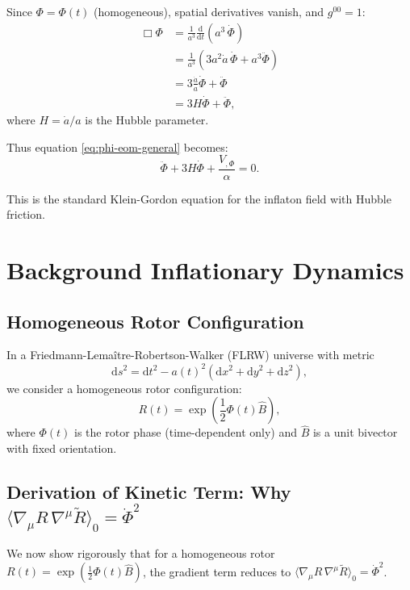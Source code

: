 \documentclass[11pt,a4paper]{article}
\numberwithin{equation}{section}
\theoremstyle{plain}
\theoremstyle{definition}
\theoremstyle{remark}
\newcommand{\dd}{\mathrm{d}}
\begin{document}
Since $\Phi = \Phi(t)$ (homogeneous), spatial derivatives vanish, and $g^{00} = 1$:
\begin{align}
\Box\Phi &= \frac{1}{a^3}\frac{\dd}{\dd t}\left(a^3\,\dot{\Phi}\right)\\
&= \frac{1}{a^3}\left(3a^2\dot{a}\,\dot{\Phi} + a^3\ddot{\Phi}\right)\\
&= 3\frac{\dot{a}}{a}\dot{\Phi} + \ddot{\Phi}\\
&= 3H\dot{\Phi} + \ddot{\Phi},
\end{align}
where $H = \dot{a}/a$ is the Hubble parameter.

Thus equation \eqref{eq:phi-eom-general} becomes:
\begin{equation}
\ddot{\Phi} + 3H\dot{\Phi} + \frac{V_{,\Phi}}{\alpha} = 0.
\label{eq:phi-klein-gordon}
\end{equation}

This is the standard Klein-Gordon equation for the inflaton field with Hubble friction.

\section{Background Inflationary Dynamics}
\label{sec:background}

\subsection{Homogeneous Rotor Configuration}

In a Friedmann-Lemaître-Robertson-Walker (FLRW) universe with metric
\begin{equation}
\dd s^2 = \dd t^2 - a(t)^2\left(\dd x^2 + \dd y^2 + \dd z^2\right),
\end{equation}
we consider a homogeneous rotor configuration:
\begin{equation}
R(t) = \exp\left(\frac{1}{2}\Phi(t)\hat{B}\right),
\end{equation}
where $\Phi(t)$ is the rotor phase (time-dependent only) and $\hat{B}$ is a unit bivector with fixed orientation.

\subsection{Derivation of Kinetic Term: Why $\langle \nabla_\mu R\,\nabla^\mu \widetilde{R} \rangle_0 = \dot{\Phi}^2$}

We now show rigorously that for a homogeneous rotor $R(t) = \exp(\frac{1}{2}\Phi(t)\hat{B})$, the gradient term reduces to $\langle \nabla_\mu R\,\nabla^\mu \widetilde{R} \rangle_0 = \dot{\Phi}^2$.
\end{document}
